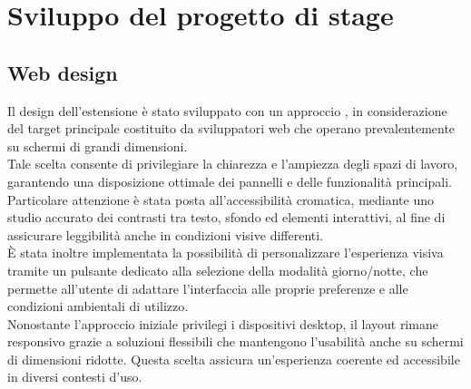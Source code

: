 \chapter{Sviluppo del progetto di stage}
\label{chap:sviluppo}

\section{Web design}
\noindent Il design dell’estensione è stato sviluppato con un approccio , in considerazione del target principale costituito da sviluppatori web che operano prevalentemente su schermi di grandi dimensioni. \\Tale scelta consente di privilegiare la chiarezza e l’ampiezza degli spazi di lavoro, garantendo una disposizione ottimale dei pannelli e delle funzionalità principali.\\
Particolare attenzione è stata posta all’accessibilità cromatica, mediante uno studio accurato dei contrasti tra testo, sfondo ed elementi interattivi, al fine di assicurare leggibilità anche in condizioni visive differenti. \\È stata inoltre implementata la possibilità di personalizzare l’esperienza visiva tramite un pulsante dedicato alla selezione della modalità giorno/notte, che permette all’utente di adattare l’interfaccia alle proprie preferenze e alle condizioni ambientali di utilizzo.\\
Nonostante l’approccio iniziale privilegi i dispositivi desktop, il layout rimane responsivo grazie a soluzioni flessibili che mantengono l’usabilità anche su schermi di dimensioni ridotte. Questa scelta assicura un’esperienza coerente ed accessibile in diversi contesti d’uso.

